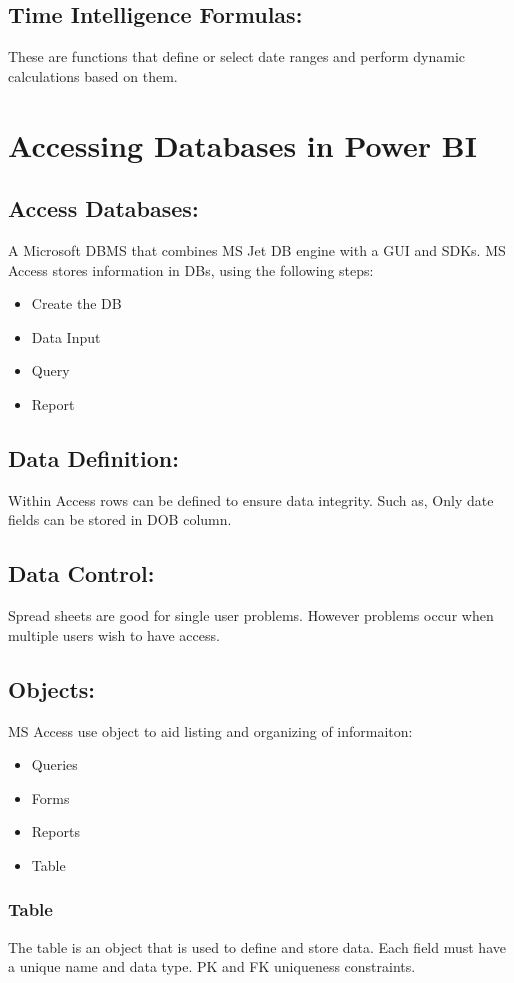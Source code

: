 \documentclass[a5paper]{article}
\begin{document}
	\subsection{Time Intelligence Formulas:}
	These are functions that define or select date ranges and perform dynamic calculations based on them.

	\section{Accessing Databases in Power BI}
	\subsection{Access Databases:}
	A Microsoft DBMS that combines MS Jet DB engine with a GUI and SDKs. MS Access stores information in DBs, using the following steps:
	\begin{itemize}
		\item Create the DB
		\item Data Input
		\item Query
		\item Report
	\end{itemize}
	\subsection{Data Definition:}
	Within Access rows can be defined to ensure data integrity. Such as, Only date fields can be stored in DOB column.
	\subsection{Data Control:}
	Spread sheets are good for single user problems. However problems occur when multiple users wish to have access.
	\pagebreak
	\subsection{Objects:}
	MS Access use object to aid listing and organizing of informaiton:
	\begin{itemize}
		\item Queries
		\item Forms
		\item Reports
		\item Table
	\end{itemize}
	\subsubsection{Table}
	The table is an object that is used to define and store data. Each field must have a unique name and data type. PK and FK uniqueness constraints.
\end{document}
